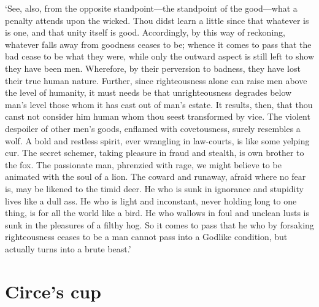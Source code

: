 \documentclass[11pt]{book}
\begin{document}
`See, also, from the opposite standpoint---the standpoint of the
good---what a penalty attends upon the \linebreak wicked. Thou didst learn a little
since that whatever is is one, and that unity itself is good.
Accordingly, by this way of reckoning, whatever falls away from goodness
ceases to be; whence it comes to pass that the bad cease to be what they
were, while only the outward aspect is still left to show they have been
men. Wherefore, by their perversion to badness, they have lost their
true human nature. Further, since righteousness alone can raise men
above the level of humanity, it must needs be that unrighteousness
degrades below man's level those whom it has cast out of man's estate.
It results, then, that thou canst not consider him human whom thou seest
transformed by vice. The violent despoiler of other men's goods,
enflamed with covetousness, surely resembles a wolf. A bold and restless
spirit, ever wrangling in law-courts, is like some yelping cur. The
secret schemer, taking pleasure in fraud and stealth, is own brother to
the fox. The passionate man, phrenzied with rage, we might believe to be
animated with the soul of a lion. The coward and runaway, afraid where
no fear is, may be likened to the timid deer. He who is sunk in
ignorance and stupidity lives like a dull ass. He who is light and
inconstant, never holding long to one thing, is for all the world like a
bird. He who wallows in foul and unclean lusts is sunk in the pleasures
of a filthy hog. So it comes to pass that he who by forsaking
righteousness ceases to be a man cannot pass into a Godlike condition,
but actually turns into a brute beast.'



\section{Circe's cup}
\end{document}
